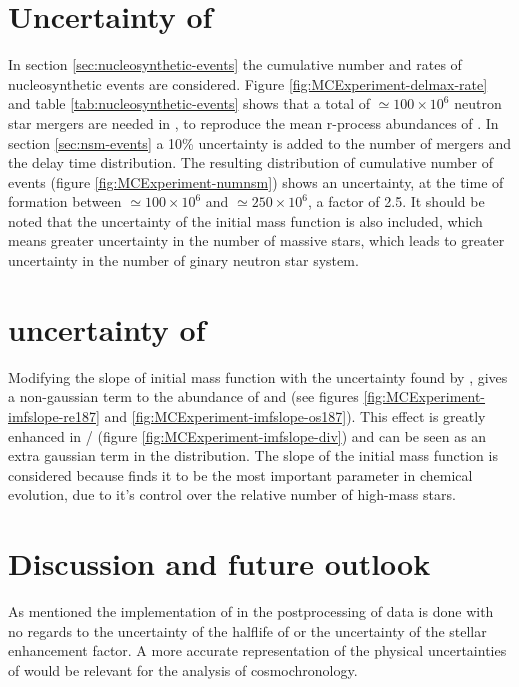 \section{Uncertainty of \expthree}
In section \ref{sec:nucleosynthetic-events} the cumulative number and rates of nucleosynthetic events are considered.
Figure \ref{fig:MCExperiment-delmax-rate} and table \ref{tab:nucleosynthetic-events} shows that a total of $\simeq100\times 10^6$ neutron star mergers are needed in \omegamodel, to reproduce the mean r-process abundances of \eris.
In section \ref{sec:nsm-events} a 10\% uncertainty is added to the number of mergers and the delay time distribution.
The resulting distribution of cumulative number of events (figure \ref{fig:MCExperiment-numnsm}) shows an uncertainty, at the time of \sos formation between $\simeq 100\times 10^{6}$ and $\simeq 250\times 10^{6}$, a factor of 2.5.
It should be noted that the uncertainty of the initial mass function is also included, which means greater uncertainty in the number of massive stars, which leads to greater uncertainty in the number of ginary neutron star system.

\section{uncertainty of \exptwo}
Modifying the slope of initial mass function with the uncertainty found by , gives a non-gaussian term to the abundance of  and  (see figures \ref{fig:MCExperiment-imfslope-re187} and \ref{fig:MCExperiment-imfslope-os187}).
This effect is greatly enhanced in / (figure \ref{fig:MCExperiment-imfslope-div}) and can be seen as an extra gaussian term in the distribution.
The slope of the initial mass function is considered because  finds it to be the most important parameter in chemical evolution, due to it's control over the relative number of high-mass stars.

\section{Discussion and future outlook}
As mentioned the implementation of \betadecay in the postprocessing of data is done with no regards to the uncertainty of the halflife of  or the uncertainty of the stellar enhancement factor.
A more accurate representation of the physical uncertainties of \betadecay would be relevant for the analysis of cosmochronology.

